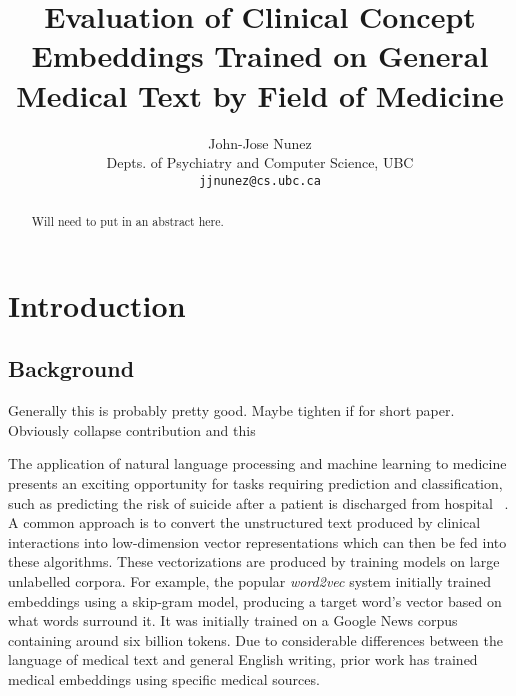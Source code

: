 \documentclass[11pt,a4paper]{article}
\title{Evaluation of Clinical Concept Embeddings Trained on General Medical Text by Field of Medicine}
\author{John-Jose Nunez\\
  Depts. of Psychiatry and Computer Science, UBC\\
  {\tt jjnunez@cs.ubc.ca} 
}
\date{}
\def\red#1{{\color{red}#1}}
\begin{document}
\maketitle
\begin{abstract}
	Will need to put in an abstract here.
\end{abstract}

\section{Introduction}

\subsection{Background}



\red{Generally this is probably pretty good. Maybe tighten if for short paper. Obviously collapse contribution and this}

The application of natural language processing and machine learning to medicine presents an exciting opportunity for tasks requiring prediction and classification, such as predicting the risk of suicide after a patient is discharged from hospital ~\cite{mccoyImprovingPredictionSuicide2016}. A common approach is to convert the unstructured text produced by clinical interactions into low-dimension vector representations which can then be fed into these algorithms. These vectorizations are produced by training models on large unlabelled corpora. For example, the popular \emph{word2vec} system \cite{mikolovEfficientEstimationWord2013} initially trained embeddings using a skip-gram model, producing a target word's vector based on what words surround it. It was initially trained on a Google News corpus containing around six billion tokens. Due to considerable differences between the language of medical text and general English writing, prior work has trained medical embeddings using specific medical sources. 
\end{document}
